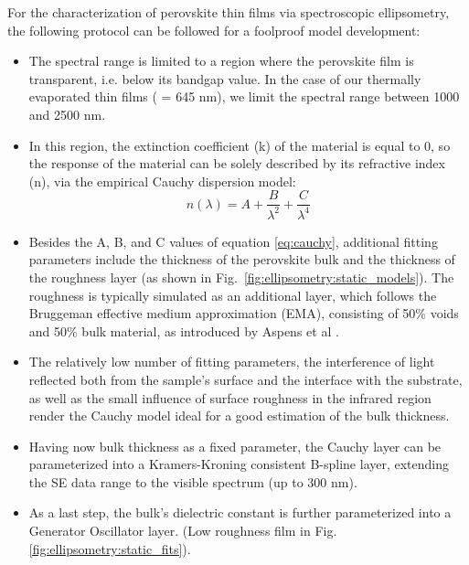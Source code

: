 For the characterization of perovskite thin films via spectroscopic ellipsometry, the following protocol can be followed for a foolproof model development: 
\begin{itemize}
    \item The spectral range is limited to a region where the perovskite film is transparent, i.e. below its bandgap value. In the case of our thermally evaporated  thin films ( = 645 nm), we limit the spectral range between 1000 and 2500 nm. 
    \item In this region, the extinction coefficient (k) of the material is equal to 0, so the response of the material can be solely described by its refractive index (n), via the empirical Cauchy dispersion model:
        \begin{equation}
            n(\lambda) = A + \frac{B}{\lambda^2} + \frac{C}{\lambda^4}
            \label{eq:cauchy}
        \end{equation}
    \item Besides the A, B, and C values of equation \ref{eq:cauchy}, additional fitting parameters include the thickness of the perovskite bulk and the thickness of the roughness layer (as shown in Fig.~\ref{fig:ellipsometry:static_models}). The roughness is typically simulated as an additional layer, which follows the Bruggeman effective medium approximation (EMA), consisting of 50\% voids and 50\% bulk material, as introduced by Aspens et al \cite{Aspnes1979InvestigationEllipsometry}. 

    \item The relatively low number of fitting parameters, the interference of light reflected both from the sample's surface and the interface with the substrate, as well as the small influence of surface roughness in the infrared region render the Cauchy model ideal for a good estimation of the bulk thickness. 

    \item Having now bulk thickness as a fixed parameter, the Cauchy layer can be parameterized into a Kramers-Kroning consistent B-spline layer, extending the SE data range to the visible spectrum (up to 300 nm). 

    \item As a last step, the bulk's dielectric constant is further parameterized into a Generator Oscillator layer. (Low roughness film in Fig.\ref{fig:ellipsometry:static_fits}).    

\end{itemize}

